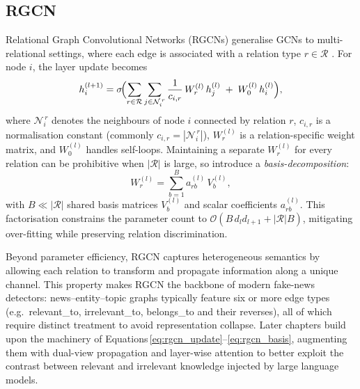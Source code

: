 \subsection{RGCN}\label{sec:gcn:rgcn}
Relational Graph Convolutional Networks (RGCNs) generalise GCNs to
multi-relational settings, where each edge is associated with a relation
type $r\in\mathcal R$ \cite{schlichtkrull2017rgcn}.
For node $i$, the layer update becomes
\begin{equation}
h_{i}^{(l+1)}
  = \sigma\!
    \Bigl(
      \sum_{r\in\mathcal R}
        \sum_{j\in\mathcal N_i^{\,r}}
          \frac{1}{c_{i,r}}\,
          W_{r}^{(l)}\,h_{j}^{(l)}
      \;+\;
      W_{0}^{(l)}\,h_{i}^{(l)}
    \Bigr),
\label{eq:rgcn_update}
\end{equation}
where $\mathcal N_i^{\,r}$ denotes the neighbours of node $i$ connected by
relation $r$, $c_{i,r}$ is a normalisation constant (commonly
$c_{i,r}=|\mathcal N_i^{\,r}|$), $W_{r}^{(l)}$ is a relation-specific weight
matrix, and $W_{0}^{(l)}$ handles self-loops.
Maintaining a separate $W_{r}^{(l)}$ for every relation can be prohibitive
when $|\mathcal R|$ is large, so \cite{schlichtkrull2018rgcn}
introduce a \emph{basis-decomposition}:
\begin{equation}
W_{r}^{(l)}
   = \sum_{b=1}^{B}
        a_{r b}^{(l)}\,
        V_{b}^{(l)},
\label{eq:rgcn_basis}
\end{equation}
with $B\ll|\mathcal R|$ shared basis matrices $V_{b}^{(l)}$
and scalar coefficients $a_{r b}^{(l)}$.
This factorisation constrains the parameter count to
$\mathcal O(B\,d_{l} d_{l+1} + |\mathcal R| B)$,
mitigating over-fitting while preserving relation discrimination.

Beyond parameter efficiency, RGCN captures heterogeneous semantics by
allowing each relation to transform and propagate information along a unique
channel.
This property makes RGCN the backbone of modern fake-news detectors:
news–entity–topic graphs typically feature six or more edge types
(e.g.\ relevant\_to, irrelevant\_to, belongs\_to and their reverses),
all of which require distinct treatment to avoid representation collapse.
Later chapters build upon the machinery of
Equations\,\eqref{eq:rgcn_update}–\eqref{eq:rgcn_basis},
augmenting them with dual-view propagation and layer-wise attention to
better exploit the contrast between relevant and irrelevant
knowledge injected by large language models.

